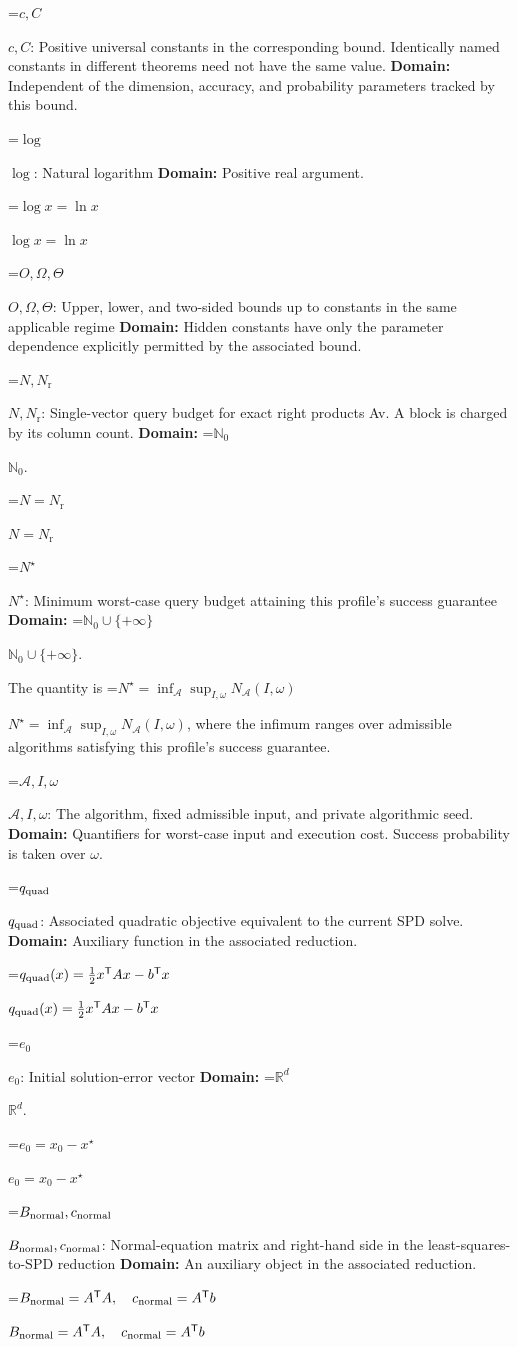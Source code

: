 \documentclass[10pt,a4paper]{article}
\newcommand{\AtlasMath}[1]{\par\begingroup\centering\setbox0=\hbox{$\displaystyle #1$}\ifdim\wd0>1.4\linewidth\typeout{ATLAS WIDE FORMULA: \the\wd0}\fi\ifdim\wd0>\linewidth\resizebox{\linewidth}{!}{\box0}\else\box0\fi\par\endgroup}
\newcommand{\AtlasInlineMath}[1]{\begingroup\setbox0=\hbox{$#1$}\ifdim\wd0>.4\linewidth\endgroup\AtlasMath{#1}\else\endgroup$#1$\fi}
\begin{document}
\AtlasInlineMath{c,C}: Positive universal constants in the corresponding bound. Identically named constants in different theorems need not have the same value. \textbf{Domain:} Independent of the dimension, accuracy, and probability parameters tracked by this bound.

\AtlasInlineMath{\log}: Natural logarithm \textbf{Domain:} Positive real argument.

\AtlasInlineMath{\log x=\ln x}

\AtlasInlineMath{O,\Omega,\Theta}: Upper, lower, and two-sided bounds up to constants in the same applicable regime \textbf{Domain:} Hidden constants have only the parameter dependence explicitly permitted by the associated bound.

\AtlasInlineMath{N,N_{\mathrm r}}: Single-vector query budget for exact right products Av. A block is charged by its column count. \textbf{Domain:} \AtlasInlineMath{\mathbb N_0}.

\AtlasInlineMath{N=N_{\mathrm r}}

\AtlasInlineMath{N^\star}: Minimum worst-case query budget attaining this profile's success guarantee \textbf{Domain:} \AtlasInlineMath{\mathbb N_0\cup\{+\infty\}}.

The quantity is \AtlasInlineMath{N^\star=\inf_{\mathcal A}\sup_{I,\omega}N_{\mathcal A}(I,\omega)}, where the infimum ranges over admissible algorithms satisfying this profile's success guarantee.

\AtlasInlineMath{\mathcal A,I,\omega}: The algorithm, fixed admissible input, and private algorithmic seed. \textbf{Domain:} Quantifiers for worst-case input and execution cost. Success probability is taken over $\omega$.

\AtlasInlineMath{q_{\rm quad}}: Associated quadratic objective equivalent to the current SPD solve. \textbf{Domain:} Auxiliary function in the associated reduction.

\AtlasInlineMath{q_{\rm quad}(x)=\tfrac12x^{\mathsf T}Ax-b^{\mathsf T}x}

\AtlasInlineMath{e_0}: Initial solution-error vector \textbf{Domain:} \AtlasInlineMath{\mathbb R^d}.

\AtlasInlineMath{e_0=x_0-x^\star}

\AtlasInlineMath{B_{\rm normal},c_{\rm normal}}: Normal-equation matrix and right-hand side in the least-squares-to-SPD reduction \textbf{Domain:} An auxiliary object in the associated reduction.

\AtlasInlineMath{B_{\rm normal}=A^{\mathsf T}A,\quad c_{\rm normal}=A^{\mathsf T}b}
\end{document}
